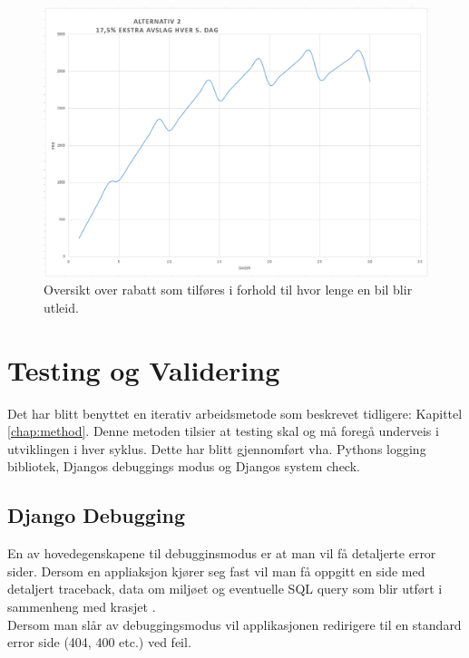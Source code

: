  \begin{figure}[htbp]
	\centering
		\includegraphics[scale=0.5]{Bilder/avslag2.png}
	\caption[Utleiepris Diagram]{Oversikt over rabatt som tilføres i forhold til hvor lenge en bil blir utleid. } %
	\label{fig:price_reduction}
\end{figure}




\clearpage


\clearpage
\section{Testing og Validering}
Det har blitt benyttet en iterativ arbeidsmetode som beskrevet tidligere: Kapittel \ref{chap:method}. Denne metoden tilsier at testing skal og må foregå underveis i utviklingen i hver syklus. Dette har blitt gjennomført vha. Pythons logging bibliotek, Djangos debuggings modus og Djangos system check. 

\subsection{Django Debugging}
En av hovedegenskapene til debugginsmodus er at man vil få detaljerte error sider.  Dersom en appliaksjon kjører seg fast vil man få oppgitt en side med detaljert traceback, data om miljøet og eventuelle SQL query som blir utført i sammenheng med krasjet \cite{django:debug}. \\
Dersom man slår av debuggingsmodus vil applikasjonen redirigere til en standard error side (404, 400 etc.) ved feil.


